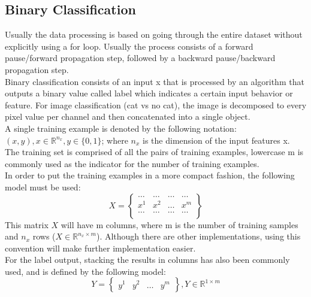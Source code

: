 \documentclass[11pt]{report}
\begin{document}
\subsection{Binary Classification}
Usually the data processing is based on going through the entire dataset without explicitly using a for loop. Usually the process consists of a forward pause/forward propagation step, followed by a backward pause/backward propagation step.\\
Binary classification consists of an input x that is processed by an algorithm that outputs a binary value called label which indicates a certain input behavior or feature. For image classification (cat vs no cat), the image is decomposed to every pixel value per channel and then concatenated into a single object. \\
A single training example is denoted by the following notation:\\
$(x,y), x \in \mathbb{R}^{n_x}, y \in \{0,1\}$; where $n_x$ is the dimension of the input features x.\\
The training set is comprised of all the pairs of training examples, lowercase m is commonly used as the indicator for the number of training examples.\\
In order to put the training examples in a more compact fashion, the following model must be used:
\begin{equation}
	X =
	\begin{Bmatrix} 
	\dots & \dots & \dots & \dots\\
	x^1 & x^2 & \dots & x^m \\
	\dots & \dots & \dots & \dots\\
	\end{Bmatrix} 
 \end{equation}
This matrix $X$ will have m columns, where m is the number of training samples and $n_x$ rows ($X \in \mathbb{R}^{n_x \times m}$). Although there are other implementations, using this convention will make further implementation easier.\\
For the label output, stacking the results in columns has also been commonly used, and is defined by the following model:
\begin{equation}
	Y =
	\begin{Bmatrix} 
	y^1 & y^2 & \dots & y^m
	\end{Bmatrix}
	, Y \in \mathbb{R}^{1 \times m} 
 \end{equation}
\end{document}
